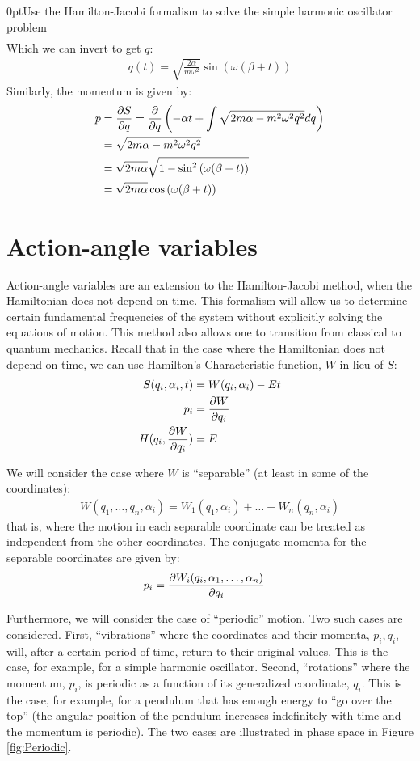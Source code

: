 \begin{example}{0pt}{Use the Hamilton-Jacobi formalism to solve the simple harmonic oscillator problem}{}
\begin{align*}
\end{align*}
Which we can invert to get $q$:
\begin{align*}
q(t)=\sqrt{\frac{2\alpha}{m\omega^2}}\sin\left(\omega(\beta+t)\right)
\end{align*}
Similarly, the momentum is given by:
\begin{align*}
p&=\frac{\partial S}{\partial q}=\frac{\partial }{\partial q}\left(-\alpha t+\int \sqrt{2m\alpha-m^2\omega^2q^2}dq\right)\\
&=\sqrt{2m\alpha-m^2\omega^2q^2}\\
&=\sqrt{2m\alpha}\sqrt{1-\sin^2\left(\omega(\beta+t)\right)}\\
&=\sqrt{2m\alpha}\cos\left(\omega(\beta+t)\right)
\end{align*}
\end{example}

\section{Action-angle variables}
Action-angle variables are an extension to the Hamilton-Jacobi method, when the Hamiltonian does not depend on time. This formalism will allow us to determine certain fundamental frequencies of the system without explicitly solving the equations of motion. This method also allows one to transition from classical to quantum mechanics. Recall that in the case where the Hamiltonian does not depend on time, we can use Hamilton's Characteristic function, $W$ in lieu of $S$:
\begin{align}
S(q_i,\alpha_i,t)&=W(q_i,\alpha_i)-Et\nonumber\\
p_i&=\frac{\partial W}{\partial q_i}\nonumber\\
H(q_i,\frac{\partial W}{\partial q_i})&=E
\end{align}

We will consider the case where $W$ is ``separable'' (at least in some of the coordinates):
\begin{align}
W(q_1,\dots, q_n,\alpha_i)=W_1(q_1,\alpha_i)+\dots +W_n(q_n,\alpha_i)
\end{align}
that is, where the motion in each separable coordinate can be treated as independent from the other coordinates. The conjugate momenta for the separable coordinates are given by:
\begin{align}
p_i&=\frac{\partial W_i(q_i, \alpha_1, \dots , \alpha_n)}{\partial q_i}\nonumber
\end{align}

Furthermore, we will consider the case of ``periodic'' motion. Two such cases are considered. First, ``vibrations'' where the coordinates and their momenta, $p_i,q_i$, will, after a certain period of time, return to their original values. This is the case, for example, for a simple harmonic oscillator. Second, ``rotations'' where the momentum, $p_i$, is periodic as a function of its generalized coordinate, $q_i$. This is the case, for example, for a pendulum that has enough energy to ``go over the top'' (the angular position of the pendulum increases indefinitely with time and the momentum is periodic). The two cases are illustrated in phase space in Figure \ref{fig:Periodic}.

